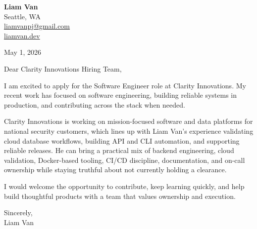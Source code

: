 \documentclass[letterpaper,11pt]{article}
\begin{document}
\begin{flushleft}
\textbf{\Large Liam Van} \\
Seattle, WA \\
\href{mailto:liamvanpj@gmail.com}{liamvanpj@gmail.com} \\
\href{https://liamvan.dev}{liamvan.dev}
\end{flushleft}

May 1, 2026

\noindent Dear Clarity Innovations Hiring Team,

\noindent I am excited to apply for the Software Engineer role at Clarity Innovations. My recent work has focused on software engineering, building reliable systems in production, and contributing across the stack when needed.

\noindent Clarity Innovations is working on mission-focused software and data platforms for national security customers, which lines up with Liam Van's experience validating cloud database workflows, building API and CLI automation, and supporting reliable releases. He can bring a practical mix of backend engineering, cloud validation, Docker-based tooling, CI/CD discipline, documentation, and on-call ownership while staying truthful about not currently holding a clearance.

\noindent I would welcome the opportunity to contribute, keep learning quickly, and help build thoughtful products with a team that values ownership and execution.

\noindent Sincerely, \\
Liam Van
\end{document}
